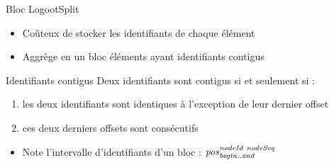 \begin{frame}[fragile]{Bloc LogootSplit}
    \begin{itemize}
        \item Coûteux de stocker les identifiants de chaque élément
    \end{itemize}
    \begin{figure}[!ht]
    \end{figure}
    \pause
    \vspace{-1em}
    \begin{itemize}
        \item Aggrège en un \alert{bloc} éléments ayant \alert{identifiants contigus}
    \end{itemize}
    \begin{block}{Identifiants contigus}
        Deux identifiants sont contigus si et seulement si :
        \begin{enumerate}
            \item les deux identifiants sont identiques à l'exception de leur dernier offset
            \item ces deux derniers offsets sont consécutifs
        \end{enumerate}
    \end{block}
    \pause
    \begin{itemize}
        \item Note l'intervalle d'identifiants d'un bloc : $\mathit{pos}^{\mathit{nodeId~nodeSeq}}_{\mathit{begin..end}}$
    \end{itemize}
    \begin{figure}[!ht]
    \end{figure}
\end{frame}

